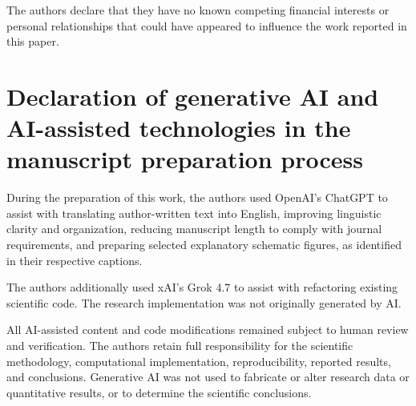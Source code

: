 The authors declare that they have no known competing financial interests
or personal relationships that could have appeared to influence the work
reported in this paper.


\section*{Declaration of generative AI and AI-assisted technologies
in the manuscript preparation process}

During the preparation of this work, the authors used OpenAI's ChatGPT to
assist with translating author-written text into English, improving linguistic
clarity and organization, reducing manuscript length to comply with journal
requirements, and preparing selected explanatory schematic figures, as
identified in their respective captions.

The authors additionally used xAI's Grok 4.7 to assist with refactoring
existing scientific code. The research implementation was not originally
generated by AI.

All AI-assisted content and code modifications remained subject to human
review and verification. The authors retain full responsibility for the
scientific methodology, computational implementation, reproducibility,
reported results, and conclusions. Generative AI was not used to fabricate
or alter research data or quantitative results, or to determine the
scientific conclusions.